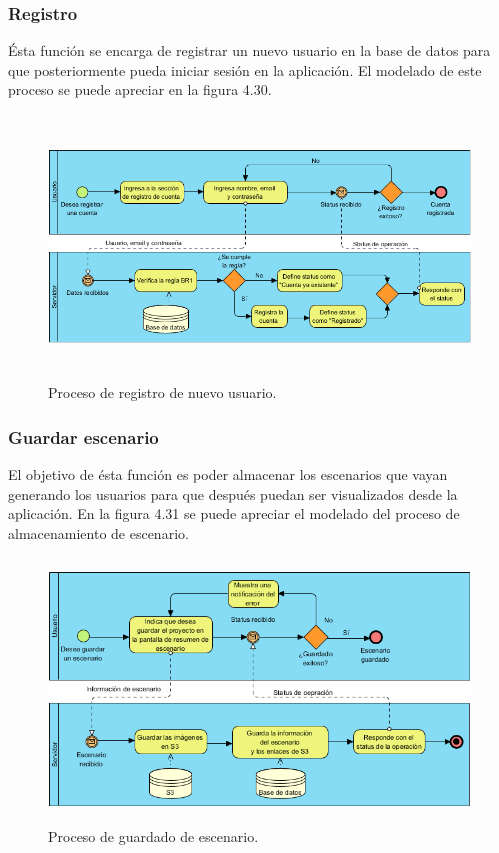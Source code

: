 \subsubsection{Registro}
Ésta función se encarga de registrar un nuevo usuario en la base de datos para que posteriormente pueda iniciar sesión en la aplicación. El modelado de este proceso se puede apreciar en la figura 4.30. \par
\begin{figure}[h!]
	\centering
	\includegraphics[width=15cm,height=7cm]{imagenes/desarrollo/diagramas/BPMN_REGISTRAR_CUENTA.png}
	\caption{Proceso de registro de nuevo usuario.}
	\label{fig:regsuccess}
\end{figure}
\par

\subsubsection{Guardar escenario}
El objetivo de ésta función es poder almacenar los escenarios que vayan generando los usuarios para que después puedan ser visualizados desde la aplicación. En la figura 4.31 se puede apreciar el modelado del proceso de almacenamiento de escenario. \par
\begin{figure}[h!]
	\centering
	\includegraphics[width=13cm,height=7cm]{imagenes/desarrollo/diagramas/BPMN_STORESC.png}
	\caption{Proceso de guardado de escenario.}
	\label{fig:regsuccess}
\end{figure}
\clearpage